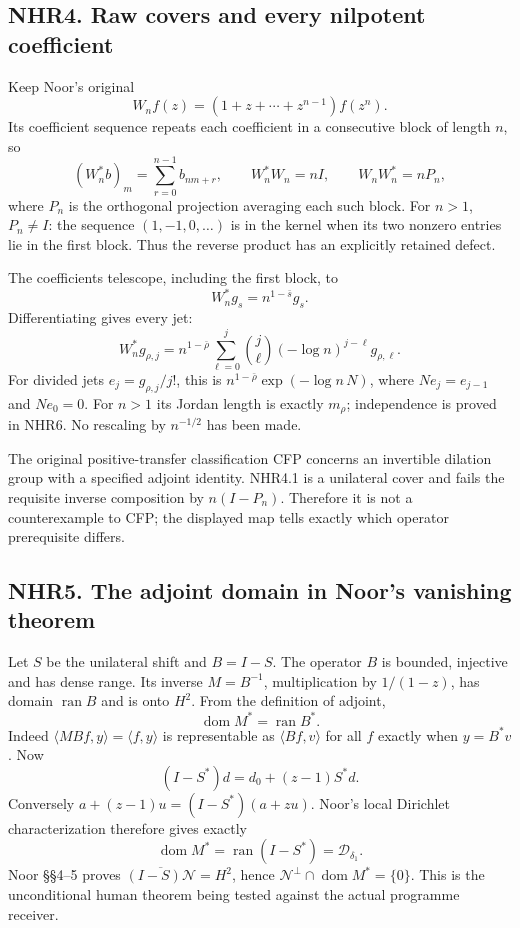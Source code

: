\subsection{NHR4. Raw covers and every nilpotent
coefficient}\label{nhr4.-raw-covers-and-every-nilpotent-coefficient}

Keep Noor's original \[
 W_nf(z)=(1+z+\cdots+z^{n-1})f(z^n).
\] Its coefficient sequence repeats each coefficient in a consecutive
block of length \(n\), so \[
 (W_n^*b)_m=\sum_{r=0}^{n-1}b_{nm+r},\qquad
 W_n^*W_n=nI,\qquad W_nW_n^*=nP_n,
 \tag{NHR4.1}
\] where \(P_n\) is the orthogonal projection averaging each such block.
For \(n>1\), \(P_n\ne I\): the sequence \((1,-1,0,\ldots)\) is in the
kernel when its two nonzero entries lie in the first block. Thus the
reverse product has an explicitly retained defect.

The coefficients telescope, including the first block, to \[
 W_n^*g_s=n^{1-\bar s}g_s.
\] Differentiating gives every jet: \[
 \boxed{W_n^*g_{\rho,j}
 =n^{1-\bar\rho}\sum_{\ell=0}^j
 \binom j\ell(-\log n)^{j-\ell}g_{\rho,\ell}.}
 \tag{NHR4.2}
\] For divided jets \(e_j=g_{\rho,j}/j!\), this is
\(n^{1-\bar\rho}\exp(-\log n\,N)\), where \(Ne_j=e_{j-1}\) and
\(Ne_0=0\). For \(n>1\) its Jordan length is exactly \(m_\rho\);
independence is proved in NHR6. No rescaling by \(n^{-1/2}\) has been
made.

The original positive-transfer classification CFP concerns an invertible
dilation group with a specified adjoint identity. NHR4.1 is a unilateral
cover and fails the requisite inverse composition by \(n(I-P_n)\).
Therefore it is not a counterexample to CFP; the displayed map tells
exactly which operator prerequisite differs.

\subsection{NHR5. The adjoint domain in Noor's vanishing
theorem}\label{nhr5.-the-adjoint-domain-in-noors-vanishing-theorem}

Let \(S\) be the unilateral shift and \(B=I-S\). The operator \(B\) is
bounded, injective and has dense range. Its inverse \(M=B^{-1}\),
multiplication by \(1/(1-z)\), has domain \(\operatorname{ran}B\) and is
onto \(H^2\). From the definition of adjoint, \[
 \operatorname{dom}M^*=\operatorname{ran}B^*.
\] Indeed \(\langle M Bf,y\rangle=\langle f,y\rangle\) is representable
as \(\langle Bf,v\rangle\) for all \(f\) exactly when \(y=B^*v\). Now \[
 (I-S^*)d=d_0+(z-1)S^*d.
\] Conversely \(a+(z-1)u=(I-S^*)(a+zu)\). Noor's local Dirichlet
characterization therefore gives exactly \[
 \operatorname{dom}M^*=\operatorname{ran}(I-S^*)=\mathcal D_{\delta_1}.
 \tag{NHR5.1}
\] Noor §§4--5 proves \(\overline{(I-S)\mathcal N}=H^2\), hence
\(\mathcal N^\perp\cap\operatorname{dom}M^*=\{0\}\). This is the
unconditional human theorem being tested against the actual programme
receiver.

